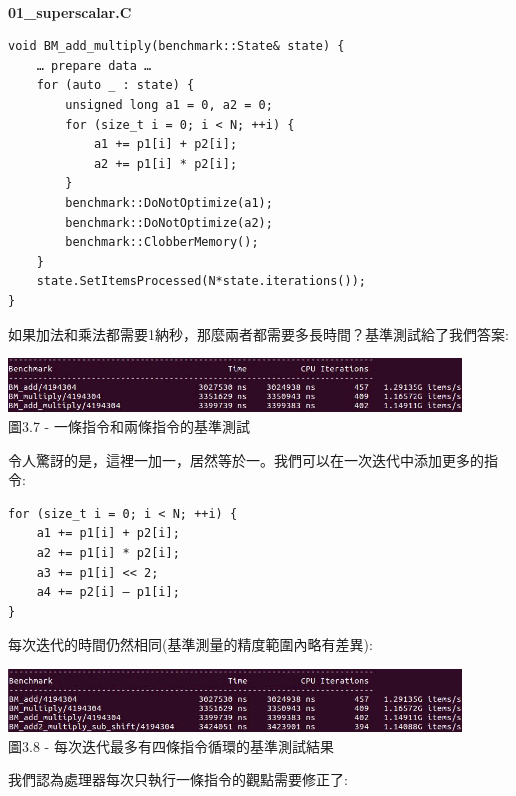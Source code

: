 \hspace*{\fill} \\ %
\noindent
\textbf{01\_superscalar.C}
\begin{lstlisting}[style=styleCXX]
void BM_add_multiply(benchmark::State& state) {
	… prepare data …
	for (auto _ : state) {
		unsigned long a1 = 0, a2 = 0;
		for (size_t i = 0; i < N; ++i) {
			a1 += p1[i] + p2[i];
			a2 += p1[i] * p2[i];
		}
		benchmark::DoNotOptimize(a1);
		benchmark::DoNotOptimize(a2);
		benchmark::ClobberMemory();
	}
	state.SetItemsProcessed(N*state.iterations());
}
\end{lstlisting}

如果加法和乘法都需要1納秒，那麼兩者都需要多長時間？基準測試給了我們答案:

\begin{center}
\includegraphics[width=0.9\textwidth]{content/1/chapter3/images/7.jpg}\\
圖3.7 - 一條指令和兩條指令的基準測試
\end{center}

令人驚訝的是，這裡一加一，居然等於一。我們可以在一次迭代中添加更多的指令:

\begin{lstlisting}[style=styleCXX]
for (size_t i = 0; i < N; ++i) {
	a1 += p1[i] + p2[i];
	a2 += p1[i] * p2[i];
	a3 += p1[i] << 2;
	a4 += p2[i] – p1[i];
}
\end{lstlisting}

每次迭代的時間仍然相同(基準測量的精度範圍內略有差異):

\begin{center}
\includegraphics[width=0.9\textwidth]{content/1/chapter3/images/8.jpg}\\
圖3.8 - 每次迭代最多有四條指令循環的基準測試結果
\end{center}

我們認為處理器每次只執行一條指令的觀點需要修正了:

